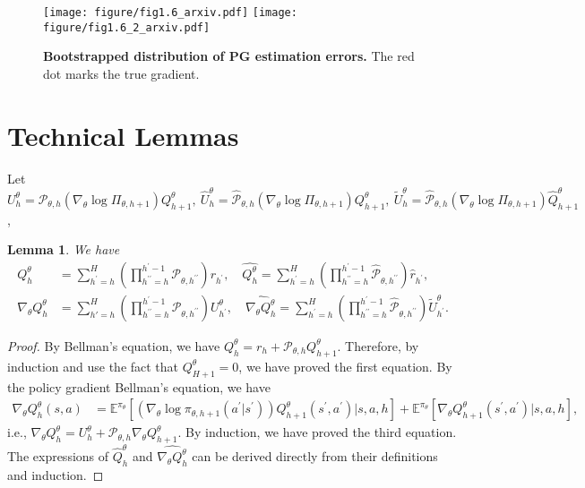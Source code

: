 \documentclass{article}
\newtheorem{lemma}{Lemma}[section]
\numberwithin{equation}{section}
\begin{document}
\begin{figure}[!t]
 \centering
  \texttt{[image: figure/fig1.6\_arxiv.pdf]}
  \texttt{[image: figure/fig1.6\_2\_arxiv.pdf]}
\caption{\textbf{Bootstrapped distribution of PG estimation errors.} The red dot marks the true gradient. } %
\label{fig:FrozenLake_4}
\end{figure}

\printbibliography

\newpage
\appendix
\section{Technical Lemmas}
Let $U_h^\theta =\mathcal{P}_{\theta,h}\left(\nabla_\theta\log\Pi_{\theta,h+1}\right) Q_{h+1}^\theta,\ \widehat{U}_h^\theta=\widehat{\mathcal{P}}_{\theta,h} \left(\nabla_\theta\log\Pi_{\theta,h+1}\right)Q_{h+1}^\theta,\ \tilde{U}_h^\theta=\widehat{\mathcal{P}}_{\theta,h}\left(\nabla_\theta\log\Pi_{\theta,h+1}\right)\widehat{Q}_{h+1}^\theta$, 
\begin{lemma}
\label{Q_decomp_base}
We have
\begin{align*}
    Q_h^\theta&=\sum_{h^\prime=h}^H\left(\prod_{h^{\prime\prime}=h}^{h^\prime-1}\mathcal{P}_{\theta, h^{\prime\prime}}\right)r_{h^\prime},\quad\widehat{Q_h^\theta}=\sum_{h^\prime=h}^H\left(\prod_{h^{\prime\prime}=h}^{h^\prime-1}\widehat{\mathcal{P}}_{\theta, h^{\prime\prime}}\right)\widehat{r}_{h^\prime},\\
    \nabla_\theta Q_h^\theta&=\sum_{h'=h}^H\left(\prod_{h^{\prime\prime}=h}^{h^\prime-1}\mathcal{P}_{\theta, h^{\prime\prime}}\right) U_{h^\prime}^{\theta},\quad\widehat{\nabla_\theta Q_h^\theta}=\sum_{h^\prime=h}^H\left(\prod_{h^{\prime\prime}=h}^{h^\prime-1}\widehat{\mathcal{P}}_{\theta, h^{\prime\prime}}\right)\tilde{U}_{h^\prime}^\theta.
\end{align*}
\end{lemma}
\begin{proof}
By Bellman's equation, we have $Q_h^\theta=r_h+\mathcal{P}_{\theta,h} Q_{h+1}^\theta$. Therefore, by induction and use the fact that $Q_{H+1}^\theta=0$, we have proved the first equation. By the policy gradient Bellman's equation, we have
\begin{align*}
    \nabla_\theta Q_h^\theta(s,a)&=\mathbb{E}^{\pi_\theta}\left[\left(\nabla_\theta\log\pi_{\theta, h+1}(a^\prime\vert s^\prime)\right)Q_{h+1}^\theta(s^\prime,a^\prime)\vert s,a,h\right]+\mathbb{E}^{\pi_\theta}\left[\nabla_\theta Q_{h+1}^\theta(s^\prime, a^\prime)\vert s,a,h\right],
\end{align*}
i.e., $\nabla_\theta Q_h^\theta=U_h^\theta+\mathcal{P}_{\theta,h}\nabla_\theta Q_{h+1}^\theta$. By induction, we have proved the third equation. The expressions of $\widehat{Q}_h^\theta$ and $\widehat{\nabla_\theta Q_h^\theta}$ can be derived directly from their definitions and induction. 
\end{proof}
\end{document}
